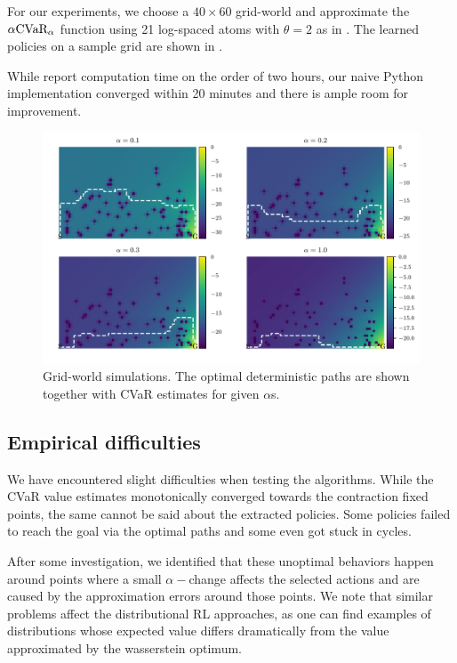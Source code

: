 For our experiments, we choose a $40 \times 60$ grid-world and approximate the $\alpha\text{CVaR}_\alpha$ function using 21 log-spaced atoms with $\theta=2$ as in \citep{chow2015risk}. The learned policies on a sample grid are shown in .

While \citet{chow2015risk} report computation time on the order of two hours, our naive Python implementation converged within 20 minutes and there is ample room for improvement.

\begin{figure}[h]
\center
\includegraphics[width=\linewidth]{gfx/vi_optimal_paths.pdf}
\caption{Grid-world simulations. The optimal deterministic paths are shown together with CVaR estimates for given $\alpha$s.}
\label{fig:vigrid}
\end{figure}

\subsection{Empirical difficulties}
We have encountered slight difficulties when testing the algorithms. While the CVaR value estimates monotonically converged towards the contraction fixed points, the same cannot be said about the extracted policies. Some policies failed to reach the goal via the optimal paths and some even got stuck in cycles.

After some investigation, we identified that these unoptimal behaviors happen around points where a small $\alpha-$change affects the selected actions and are caused by the approximation errors around those points. We note that similar problems affect the distributional RL approaches, as one can find examples of distributions whose expected value differs dramatically from the value approximated by the wasserstein optimum. 

